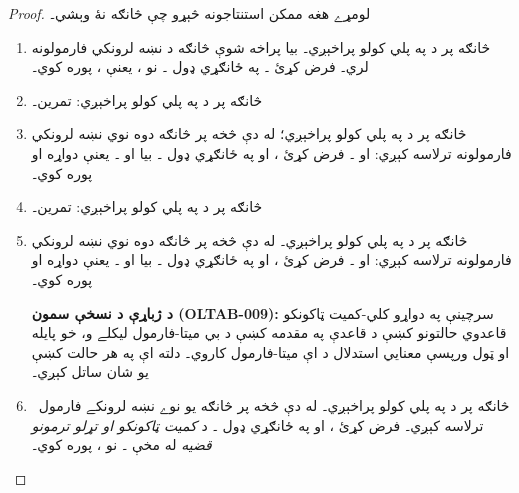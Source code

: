 \documentclass[12pt,a4paper,oneside]{report}
\theoremstyle{definition}
\begin{document}
\begin{proof}
\label{olpseg:OLP-0109-B014:start}
لومړے هغه ممکن استنتاجونه څېړو چې څانګه نۀ وېشي۔
\begin{enumerate}
\item څانګه پر  د
  \LR{$\TRule{\True}{\lnot}$} په پلي کولو پراخېږي۔ بيا پراخه شوې څانګه
  د  نښه لرونکي فارمولونه لري۔
  فرض کړئ ۔ په ځانګړي ډول
  ۔ نو
  ، يعنې
  ،
   پوره کوي۔
\item څانګه پر  د
  \LR{$\TRule{\False}{\lnot}$} په پلي کولو پراخېږي: تمرين۔
\item څانګه پر  د
  \LR{$\TRule{\True}{\land}$} په پلي کولو پراخېږي؛ له دې څخه پر څانګه
  دوه نوي نښه لرونکي فارمولونه ترلاسه کېږي:  او
  ۔ فرض کړئ
  ، او په ځانګړي ډول
  ۔ بيا
   او
  ۔ يعنې
   دواړه
   او  پوره کوي۔
\item څانګه پر  د
  \LR{$\TRule{\False}{\lor}$} په پلي کولو پراخېږي: تمرين۔
\item څانګه پر  د
  \LR{$\TRule{\False}{\lif}$} په پلي کولو پراخېږي۔ له دې څخه پر څانګه
  دوه نوي نښه لرونکي فارمولونه ترلاسه کېږي:  او
  ۔ فرض کړئ
  ، او په ځانګړي ډول
  ۔ بيا
   او
  ۔ يعنې
   دواړه
   او  پوره کوي۔
\label{olpseg:OLP-0109-B014:end}

\label{olpseg:OLP-0109-B015:start}
%
\textbf{د ژباړې د نسخې سمون (OLTAB-009):} سرچينې په دواړو
کلي-کميت ټاکونکو قاعدوي حالتونو کښې د قاعدې په مقدمه کښې د بي ميتا-فارمول
ليکلے و، خو پايله او ټول ورپسې معنايي استدلال د اې ميتا-فارمول
کاروي۔ دلته اې په هر حالت کښې يو شان ساتل کېږي۔
\item څانګه پر \LR{$\sFmla{\True}{\lforall[x][!A(x)]} \in \Gamma$} د
  \LR{$\TRule{\True}{\lforall}$} په پلي کولو پراخېږي۔ له دې څخه پر څانګه
  يو نوے نښه لرونکے فارمول~ ترلاسه کېږي۔
  فرض کړئ ، او په ځانګړي ډول
  ۔ د
  \emph{کميت ټاکونکو او تړلو ترمونو قضيه}\nobreakspace{} له مخې ۔ نو
  ،  پوره کوي۔
\label{olpseg:OLP-0109-B015:end}


\end{enumerate}
\end{proof}
\end{document}
